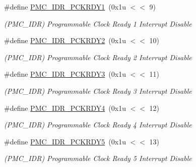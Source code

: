 \begin{DoxyCompactItemize}
\#define \mbox{\hyperlink{group__SAMS70__PMC_ga41d50baa84ca59665f79584f6c769f54}{P\+M\+C\+\_\+\+I\+D\+R\+\_\+\+P\+C\+K\+R\+D\+Y1}}~(0x1u $<$$<$ 9)
\begin{DoxyCompactList}\small\item\em (P\+M\+C\+\_\+\+I\+DR) Programmable Clock Ready 1 Interrupt Disable \end{DoxyCompactList}\item 
\mbox{\label{group__SAMS70__PMC_ga3b5f0b5c79321b5b99ab7f2fdeda0ed1}} 
\#define \mbox{\hyperlink{group__SAMS70__PMC_ga3b5f0b5c79321b5b99ab7f2fdeda0ed1}{P\+M\+C\+\_\+\+I\+D\+R\+\_\+\+P\+C\+K\+R\+D\+Y2}}~(0x1u $<$$<$ 10)
\begin{DoxyCompactList}\small\item\em (P\+M\+C\+\_\+\+I\+DR) Programmable Clock Ready 2 Interrupt Disable \end{DoxyCompactList}\item 
\mbox{\label{group__SAMS70__PMC_ga03a07ac60c6f4bcfa4b7d6aaafa462eb}} 
\#define \mbox{\hyperlink{group__SAMS70__PMC_ga03a07ac60c6f4bcfa4b7d6aaafa462eb}{P\+M\+C\+\_\+\+I\+D\+R\+\_\+\+P\+C\+K\+R\+D\+Y3}}~(0x1u $<$$<$ 11)
\begin{DoxyCompactList}\small\item\em (P\+M\+C\+\_\+\+I\+DR) Programmable Clock Ready 3 Interrupt Disable \end{DoxyCompactList}\item 
\mbox{\label{group__SAMS70__PMC_ga4885669f3403d30b978a24b457e1fcaa}} 
\#define \mbox{\hyperlink{group__SAMS70__PMC_ga4885669f3403d30b978a24b457e1fcaa}{P\+M\+C\+\_\+\+I\+D\+R\+\_\+\+P\+C\+K\+R\+D\+Y4}}~(0x1u $<$$<$ 12)
\begin{DoxyCompactList}\small\item\em (P\+M\+C\+\_\+\+I\+DR) Programmable Clock Ready 4 Interrupt Disable \end{DoxyCompactList}\item 
\mbox{\label{group__SAMS70__PMC_ga007d893a3831b046444c9b76414a98bf}} 
\#define \mbox{\hyperlink{group__SAMS70__PMC_ga007d893a3831b046444c9b76414a98bf}{P\+M\+C\+\_\+\+I\+D\+R\+\_\+\+P\+C\+K\+R\+D\+Y5}}~(0x1u $<$$<$ 13)
\begin{DoxyCompactList}\small\item\em (P\+M\+C\+\_\+\+I\+DR) Programmable Clock Ready 5 Interrupt Disable \end{DoxyCompactList}\item 
$$
\end{DoxyCompactItemize}
